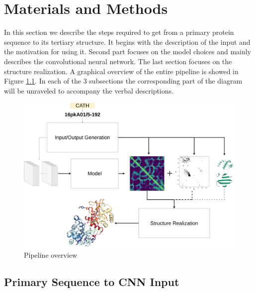 \chapter{Materials and Methods}

In this section we describe the steps required to get from a primary protein sequence to its tertiary structure.
It begins with the description of the input and the motivation for using it. 
Second part focuses on the model choices and mainly describes the convolutional neural network. 
The last section focuses on the structure realization. 
A graphical overview of the entire pipeline is showed in Figure \ref{fig:project_pipeline}. 
In each of the 3 subsections the corresponding part of the diagram will be unraveled to accompany the verbal descriptions.

\begin{figure}[ht]
    \centering
    \includegraphics[width=\linewidth]{imgs_tomas/Project_pipeline_small.png}
    \caption{Pipeline overview}
    \label{fig:project_pipeline}
\end{figure}

\section{Primary Sequence to CNN Input}

